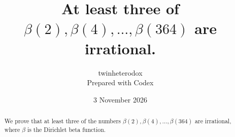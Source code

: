\documentclass[11pt]{article}
\title{At least three of $\beta(2),\beta(4),\ldots,\beta(364)$ are irrational.}
\author{twinheterodox\\[2pt]\normalsize Prepared with Codex}
\date{3 November 2026}
\theoremstyle{remark}
\numberwithin{equation}{section}
\begin{document}
\maketitle
\begin{abstract}
We prove that at least three of the numbers
$\beta(2),\beta(4),\ldots,\beta(364)$ are irrational, where $\beta$ is the
Dirichlet beta function.
\end{abstract}







\appendix


\end{document}
